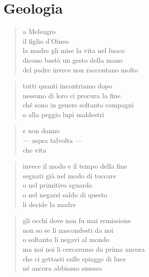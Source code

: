 \chapter*{Geologia}


\begin{verse}
    a Meleagro\\
    il figlio d'Oineo\\
    la madre gli mise la vita nel fuoco\\
    dicono bastò un gesto della mano\\
    del padre invece non raccontano molto
\end{verse}

\clearpage


\begin{verse}
    tutti quanti incontriamo dopo\\
    nessuno di loro ci procura la fine\\
    ché sono in genere soltanto compagni\\
    o alla peggio lupi maldestri
\end{verse}

\begin{verse}
    e non danno\\
    — aspra talvolta —\\
    che vita
\end{verse}

\begin{verse}
    invece il modo e il tempo della fine\\
    segnati già nel modo di toccare\\
    o nel primitivo sguardo\\
    o nel negarsi saldo di questo\\
    li decide la madre
\end{verse}

\clearpage


\begin{verse}
    gli occhi dove non fu mai remissione\\
    non so se li nascondesti da noi\\
    o soltanto li negavi al mondo\\
    ma noi noi li cercavamo da prima ancora\\
    che ci gettasti sulle spiagge di luce\\
    né ancora abbiamo smesso
\end{verse}

